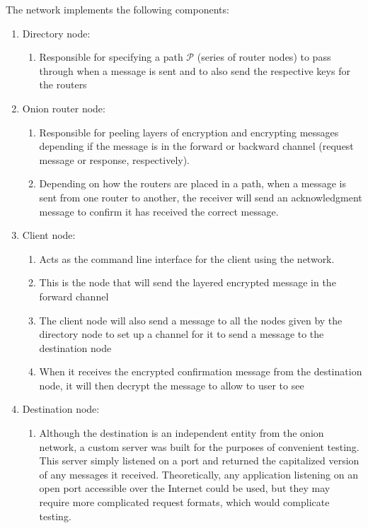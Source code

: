\documentclass[10pt]{report}
\begin{document}
The network implements the following components:
\begin{enumerate}
	\item Directory node: 
	\begin{enumerate}
		\item Responsible for specifying a path $\mathcal{P}$ (series of router nodes) to pass
		through when a message is sent and to also send the respective keys for the routers
	\end{enumerate}
	\item Onion router node: 
	\begin{enumerate}   
		\item Responsible for peeling layers of encryption and encrypting messages depending if the
			message is in the forward or backward channel (request message or response,
			respectively).
		\item Depending on how the routers are placed in a path, when a message is sent from one router to another, the receiver will send an acknowledgment message to confirm it has received the correct message.
	\end{enumerate}
    \item Client node:
    \begin{enumerate}
	    \item Acts as the command line interface for the client using the network.
        \item This is the node that will send the layered encrypted message in the forward channel
		\item The client node will also send a message to all the nodes given by the directory node
			to set up a channel for it to send a message to the destination node
		\item When it receives the encrypted confirmation message from the destination node, it will
			then decrypt the message to allow to user to see
    \end{enumerate}
	\item Destination node: 
	\begin{enumerate}
	    \item Although the destination is an independent entity from the onion network, a custom
			server was built for the purposes of convenient testing. This server simply listened on
			a port and returned the capitalized version of any messages it received. Theoretically,
			any application listening on an open port accessible over the Internet could be used,
			but they may require more complicated request formats, which would complicate testing.
	\end{enumerate}
\end{enumerate}
\end{document}
